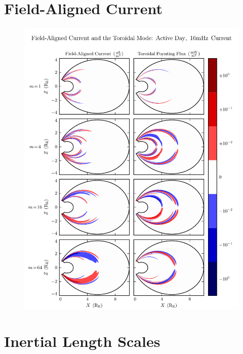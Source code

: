 \section{Field-Aligned Current}

\begin{figure}[H]
    \centering
    \includegraphics[width=\textwidth]{figures/JS_1_16mHz.pdf}
    \caption[Field-Aligned Current and the Toroidal Mode: Active Day]{}
    \label{fig_JS_1_16mHz}
\end{figure}

\section{Inertial Length Scales}


